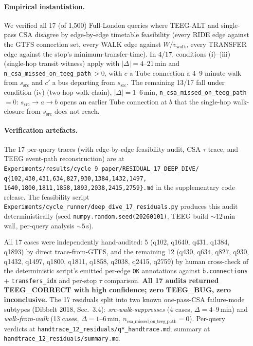 \documentclass[letterpaper]{article}
\begin{document}
\paragraph{Empirical instantiation.} We verified all 17 (of 1{,}500)
Full-London queries where TEEG-ALT and single-pass CSA disagree by
edge-by-edge timetable feasibility (every RIDE edge against the GTFS
connection set, every WALK edge against $W/v_\text{walk}$, every
TRANSFER edge against the stop's minimum-transfer-time). In 4/17,
conditions (i)--(iii) (single-hop transit witness) apply with
$|\Delta|=4\text{--}21$\,min and \texttt{n\_csa\_missed\_on\_teeg\_path}\,$>0$,
with $c$ a Tube connection a 4--9 minute walk from $s_\text{src}$ and
$c'$ a bus departing from $s_\text{src}$. The remaining 13/17 fall under
condition (iv) (two-hop walk-chain), $|\Delta|=1\text{--}6$\,min,
\texttt{n\_csa\_missed\_on\_teeg\_path}\,$=0$: $s_\text{src} \to a \to b$
opens an earlier Tube connection at $b$ that the single-hop
walk-closure from $s_\text{src}$ does not reach.

\paragraph{Verification artefacts.} The 17 per-query traces (with
edge-by-edge feasibility audit, CSA $\tau$ trace, and TEEG event-path
reconstruction) are at
\texttt{Experiments/results/cycle\_9\_paper/RESIDUAL\_17\_DEEP\_DIVE/\\q\{102,430,431,634,827,930,1384,1432,1497,\\1640,1800,1811,1858,1893,2038,2415,2759\}.md}
in the supplementary code release. The feasibility script
\texttt{Experiments/cycle\_runner/deep\_dive\_17\_residuals.py} produces
this audit deterministically (seed \texttt{numpy.random.seed(20260101)},
TEEG build $\sim 12$\,min wall, per-query analysis $\sim 5$\,s).

All 17 cases were independently hand-audited: 5 (q102, q1640, q431,
q1384, q1893) by direct trace-from-GTFS, and the remaining 12
(q430, q634, q827, q930, q1432, q1497, q1800, q1811, q1858, q2038,
q2415, q2759) by human cross-check of the deterministic script's
emitted per-edge \texttt{OK} annotations against \texttt{b.connections}
+ \texttt{transfers\_idx} and per-stop $\tau$ comparison. \textbf{All
17 audits returned TEEG\_CORRECT with high confidence; zero
TEEG\_BUG, zero inconclusive.} The 17 residuals split into two
known one-pass-CSA failure-mode subtypes (Dibbelt 2018, Sec.~3.4):
\emph{src-walk-suppresses} (4 cases, $\Delta\!=\!4\text{--}9$\,min)
and \emph{walk-from-walk} (13 cases, $\Delta\!=\!1\text{--}6$\,min,
$n_\text{csa\_missed\_on\_teeg\_path}\!=\!0$). Per-query verdicts at
\texttt{handtrace\_12\_residuals/q*\_handtrace.md}; summary at
\texttt{handtrace\_12\_residuals/summary.md}.
\end{document}
